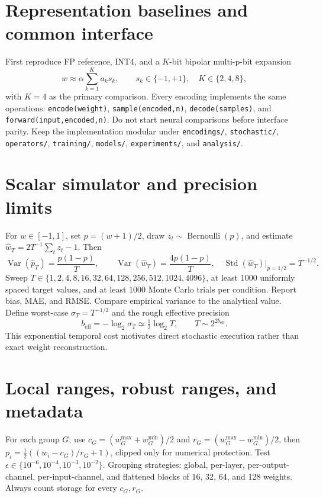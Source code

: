 \documentclass[11pt]{article}
\newcommand{\Var}{\operatorname{Var}}
\newcommand{\Bern}{\operatorname{Bernoulli}}
\begin{document}
\section{Representation baselines and common interface}
First reproduce FP reference, INT4, and a $K$-bit bipolar multi-p-bit expansion
\begin{equation}
 w\approx \alpha\sum_{k=1}^{K}a_ks_k,\qquad s_k\in\{-1,+1\},\quad K\in\{2,4,8\},
\end{equation}
with $K=4$ as the primary comparison. Every encoding implements the same operations:
\texttt{encode(weight)}, \texttt{sample(encoded,n)}, \texttt{decode(samples)}, and
\texttt{forward(input,encoded,n)}. Do not start neural comparisons before interface parity.
Keep the implementation modular under \texttt{encodings/}, \texttt{stochastic/},
\texttt{operators/}, \texttt{training/}, \texttt{models/}, \texttt{experiments/},
and \texttt{analysis/}.

\section{Scalar simulator and precision limits}
For $w\in[-1,1]$, set $p=(w+1)/2$, draw $z_t\sim\Bern(p)$, and estimate
$\hat w_T=2T^{-1}\sum_tz_t-1$. Then
\begin{equation}
 \Var(\hat p_T)=\frac{p(1-p)}T,\qquad
 \Var(\hat w_T)=\frac{4p(1-p)}T,
 \quad \operatorname{Std}(\hat w_T)|_{p=1/2}=T^{-1/2}.
\end{equation}
Sweep $T\in\{1,2,4,8,16,32,64,128,256,512,1024,4096\}$, at least 1000 uniformly
spaced target values, and at least 1000 Monte Carlo trials per condition. Report bias,
MAE, and RMSE. Compare empirical variance to the analytical value. Define worst-case
$\sigma_T=T^{-1/2}$ and the rough effective precision
\begin{equation}
 b_{\mathrm{eff}}=-\log_2\sigma_T\simeq\tfrac12\log_2T,
 \qquad T\sim2^{2b_{\mathrm{eff}}}.
\end{equation}
This exponential temporal cost motivates direct stochastic execution rather than exact
weight reconstruction.

\section{Local ranges, robust ranges, and metadata}
For each group $G$, use $c_G=(w_G^{\max}+w_G^{\min})/2$ and
$r_G=(w_G^{\max}-w_G^{\min})/2$, then
$p_i=\tfrac12((w_i-c_G)/r_G+1)$, clipped only for numerical protection. Test
$\epsilon\in\{10^{-6},10^{-4},10^{-3},10^{-2}\}$. Grouping strategies: global,
per-layer, per-output-channel, per-input-channel, and flattened blocks of 16, 32, 64,
and 128 weights. Always count storage for every $c_G,r_G$.
\end{document}
